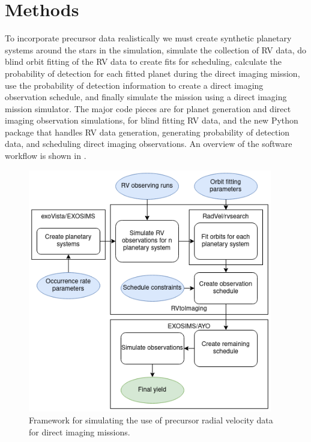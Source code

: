 \section{Methods}
To incorporate precursor data realistically we must create synthetic planetary
systems around the stars in the simulation, simulate the collection of RV data,
do blind orbit fitting of the RV data to create fits for scheduling, calculate the
probability of detection for each fitted planet during the direct imaging mission, 
use the probability of detection information to create a direct imaging
observation schedule, and finally simulate the mission using a direct imaging
mission simulator. The major code pieces are  for planet
generation and direct imaging observation simulations,  for
blind fitting RV data, and the new Python package  that
handles RV data generation, generating probability of detection data, and
scheduling direct imaging observations. An overview of the software workflow is
shown in .

\begin{figure}
  \begin{center}
    \includegraphics[width=0.95\textwidth]{ch4/figures/flowchartwhite.png}
  \end{center}
  \caption{Framework for simulating the use of precursor radial velocity data
  for direct imaging missions.}
  \label{fig:rv2imgflowchart}
\end{figure}


